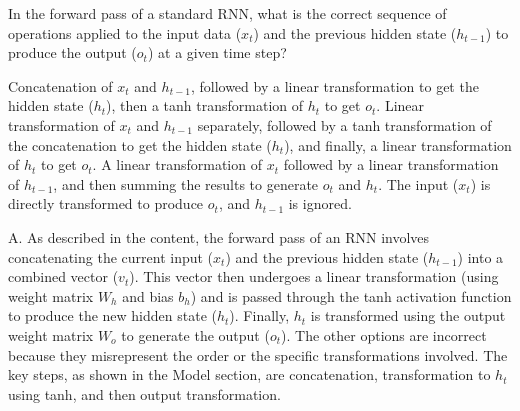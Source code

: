 \documentclass[11pt,addpoints,answers]{exam}
\begin{document}
\begin{questions}

\question[1] In the forward pass of a standard RNN, what is the correct sequence of operations applied to the input data ($x_t$) and the previous hidden state ($h_{t-1}$) to produce the output ($o_t$) at a given time step?
  \begin{choices}
    \choice Concatenation of $x_t$ and $h_{t-1}$, followed by a linear transformation to get the hidden state ($h_t$), then a tanh transformation of $h_t$ to get $o_t$.
    \choice Linear transformation of $x_t$ and $h_{t-1}$ separately, followed by a tanh transformation of the concatenation to get the hidden state ($h_t$), and finally, a linear transformation of $h_t$ to get $o_t$.
    \choice A linear transformation of $x_t$ followed by a linear transformation of $h_{t-1}$, and then summing the results to generate $o_t$ and $h_t$.
    \choice The input ($x_t$) is directly transformed to produce $o_t$, and $h_{t-1}$ is ignored.
  \end{choices}
\begin{solution}
A. As described in the content, the forward pass of an RNN involves concatenating the current input ($x_t$) and the previous hidden state ($h_{t-1}$) into a combined vector ($v_t$). This vector then undergoes a linear transformation (using weight matrix $W_h$ and bias $b_h$) and is passed through the tanh activation function to produce the new hidden state ($h_t$). Finally, $h_t$ is transformed using the output weight matrix $W_o$ to generate the output ($o_t$). The other options are incorrect because they misrepresent the order or the specific transformations involved. The key steps, as shown in the Model section, are concatenation, transformation to $h_t$ using tanh, and then output transformation.
\end{solution}


\end{questions}
\end{document}
